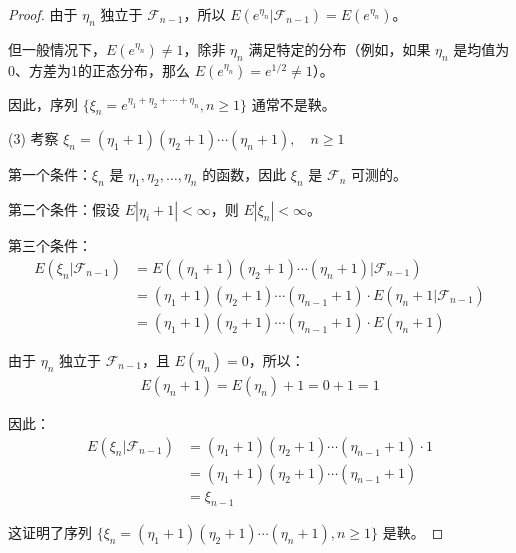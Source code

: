 \documentclass[lang=cn,10pt,thmcnt=section]{elegantbook}
\begin{document}
\begin{proof}
由于 $\eta_n$ 独立于 $\mathcal{F}_{n-1}$，所以 $E(e^{\eta_n}|\mathcal{F}_{n-1}) = E(e^{\eta_n})$。

但一般情况下，$E(e^{\eta_n}) \neq 1$，除非 $\eta_n$ 满足特定的分布（例如，如果 $\eta_n$ 是均值为0、方差为1的正态分布，那么 $E(e^{\eta_n}) = e^{1/2} \neq 1$）。

因此，序列 $\{\xi_n = e^{\eta_1 + \eta_2 + \cdots + \eta_n}, n \geq 1\}$ 通常不是鞅。

(3) 考察 $\xi_n = (\eta_1 + 1)(\eta_2 + 1) \cdots (\eta_n + 1), \quad n \geq 1$

第一个条件：$\xi_n$ 是 $\eta_1, \eta_2, \ldots, \eta_n$ 的函数，因此 $\xi_n$ 是 $\mathcal{F}_n$ 可测的。

第二个条件：假设 $E|\eta_i + 1| < \infty$，则 $E|\xi_n| < \infty$。

第三个条件：
\begin{align}
E(\xi_n|\mathcal{F}_{n-1}) &= E((\eta_1 + 1)(\eta_2 + 1) \cdots (\eta_n + 1)|\mathcal{F}_{n-1}) \\
&= (\eta_1 + 1)(\eta_2 + 1) \cdots (\eta_{n-1} + 1) \cdot E(\eta_n + 1|\mathcal{F}_{n-1}) \\
&= (\eta_1 + 1)(\eta_2 + 1) \cdots (\eta_{n-1} + 1) \cdot E(\eta_n + 1)
\end{align}

由于 $\eta_n$ 独立于 $\mathcal{F}_{n-1}$，且 $E(\eta_n) = 0$，所以：
\begin{align}
E(\eta_n + 1) = E(\eta_n) + 1 = 0 + 1 = 1
\end{align}

因此：
\begin{align}
E(\xi_n|\mathcal{F}_{n-1}) &= (\eta_1 + 1)(\eta_2 + 1) \cdots (\eta_{n-1} + 1) \cdot 1 \\
&= (\eta_1 + 1)(\eta_2 + 1) \cdots (\eta_{n-1} + 1) \\
&= \xi_{n-1}
\end{align}

这证明了序列 $\{\xi_n = (\eta_1 + 1)(\eta_2 + 1) \cdots (\eta_n + 1), n \geq 1\}$ 是鞅。

\end{proof}
\end{document}
